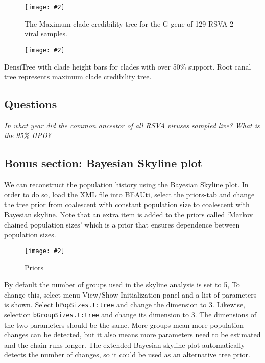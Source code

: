 \documentclass[12pt]{article}
\newcommand{\includeimage}[2][]{%
\texttt{[image: \#2]}
}
\begin{document}
\begin{figure}
\centering	
\includeimage[width=\textwidth]{figures/RSV2_mcc_tree}
\caption{The Maximum clade credibility tree for the G gene of 129 RSVA-2 viral samples. }
\label{fig:RSV2tree}
\end{figure}

\begin{figure}
\centering	
\includeimage[width=\textwidth]{figures/DensiTree}
\label{fig:DensiTree}
\end{figure}

DensiTree with clade height bars for clades with over 50\% support.
Root canal tree represents maximum clade credibility tree.


\subsection*{Questions}

\textit{In what year did the common ancestor of all RSVA viruses sampled live? What is the
95\% HPD?}



\subsection*{Bonus section: Bayesian Skyline plot}

We can reconstruct the population history using the Bayesian Skyline plot. In order to do so,
load the XML file into BEAUti, select the priors-tab and change the tree prior from 
coalescent with constant population size to coalescent with Bayesian skyline.
Note that an extra item is added to the priors called `Markov chained population sizes'
which is a prior that ensures dependence between population sizes.

\begin{figure}
\centering	
\includeimage[width=0.8\textwidth]{figures/BEAUti_priors2}
\label{fig:BEAUti_priors2}
\caption{Priors}
\end{figure}

By default the number of groups used in the skyline analysis is set to 5, To change this,
select menu View/Show Initialization panel and a list of parameters is shown. Select
{\tt bPopSizes.t:tree} and change the dimension to 3. Likewise, selection {\tt bGroupSizes.t:tree}
and change its dimension to 3. The dimensions of the two parameters should be the same.
More groups mean more population changes can be detected, but it also means more parameters
need to be estimated and the chain runs longer. The extended Bayesian skyline plot
automatically detects the number of changes, so it could be used as an alternative
tree prior.
\end{document}
